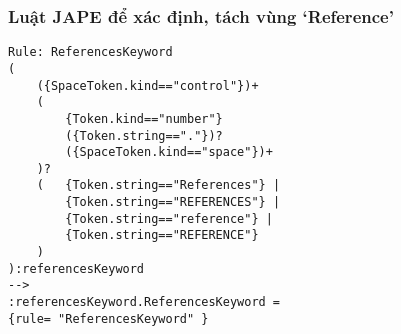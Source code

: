 \subsubsection*{Luật JAPE để xác định, tách vùng `Reference'}
\begin{lstlisting}[frame=single]
Rule: ReferencesKeyword
(
	({SpaceToken.kind=="control"})+
	(
		{Token.kind=="number"}
		({Token.string=="."})?
		({SpaceToken.kind=="space"})+
	)?
	(	{Token.string=="References"} | 
		{Token.string=="REFERENCES"} | 
		{Token.string=="reference"} | 
		{Token.string=="REFERENCE"} 
	)
):referencesKeyword 
-->
:referencesKeyword.ReferencesKeyword = 
{rule= "ReferencesKeyword" }
\end{lstlisting}

%
